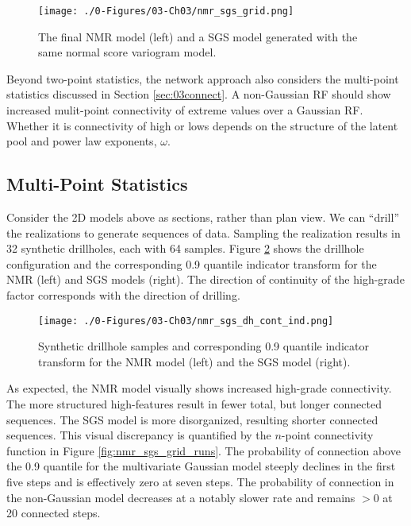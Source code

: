 \begin{figure}[htb!]
    \centering
    \texttt{[image: ./0-Figures/03-Ch03/nmr\_sgs\_grid.png]}
    \caption{ The final \gls{NMR} model (left) and a \gls{SGS} model generated with the same normal score variogram model. }
    \label{fig:nmr_sgs_grid}
\end{figure}

Beyond two-point statistics, the network approach also considers the multi-point statistics discussed in Section \ref{sec:03connect}. A non-Gaussian \gls{RF} should show increased mulit-point connectivity of extreme values over a Gaussian \gls{RF}. Whether it is connectivity of high or lows depends on the structure of the latent pool and power law exponents, $\omega$.


\FloatBarrier
\subsection{Multi-Point Statistics}
\label{subsec:03multipt}

Consider the \gls{2D} models above as sections, rather than plan view. We can ``drill'' the realizations to generate sequences of data. Sampling the realization results in 32 synthetic drillholes, each with 64 samples. Figure \ref{fig:nmr_sgs_dh_cont_ind} shows the drillhole configuration and the corresponding 0.9 quantile indicator transform for the \gls{NMR} (left) and \gls{SGS} models (right). The direction of continuity of the high-grade factor corresponds with the direction of drilling.

\begin{figure}[htb!]
    \centering
    \texttt{[image: ./0-Figures/03-Ch03/nmr\_sgs\_dh\_cont\_ind.png]}
    \caption{ Synthetic drillhole samples and corresponding 0.9 quantile indicator transform for the \gls{NMR} model (left) and the \gls{SGS} model (right).}
    \label{fig:nmr_sgs_dh_cont_ind}
\end{figure}

As expected, the \gls{NMR} model visually shows increased high-grade connectivity. The more structured high-features result in fewer total, but longer connected sequences. The \gls{SGS} model is more disorganized, resulting shorter connected sequences. This visual discrepancy is quantified by the $n$-point connectivity function in Figure \ref{fig:nmr_sgs_grid_runs}. The probability of connection above the 0.9 quantile for the multivariate Gaussian model steeply declines in the first five steps and is effectively zero at seven steps. The probability of connection in the non-Gaussian model decreases at a notably slower rate and remains $> 0$ at 20 connected steps.

